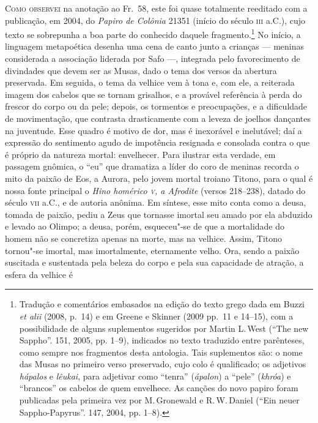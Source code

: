 \textsc{Como observei} na anotação ao Fr.~58, este foi quase totalmente reeditado com a 
publicação, em 2004, do \textit{Papiro de Colônia} 21351 (início do século \textsc{iii} a.C.), 
cujo texto se sobrepunha a boa parte do conhecido daquele fragmento.\footnote{Tradução e comentários embasados na edição do texto grego dada em Buzzi \textit{et alii} (2008, p.~14) e em Greene e Skinner (2009 pp.~11 e 14--15), com a possibilidade de alguns suplementos sugeridos por Martin L.\,West (``The new Sappho''. \textit{} 151, 2005, pp. 1--9), indicados no texto traduzido entre parênteses, como sempre nos fragmentos desta antologia. Tais suplementos são: o nome das Musas no primeiro verso preservado, cujo colo é qualificado; os adjetivos \textit{hápalos} e \textit{lêukai}, para adjetivar como ``tenra'' (\textit{ápalon}) a ``pele'' (\textit{khróa}) e ``brancos'' os cabelos de quem envelhece. As canções do novo papiro foram publicadas pela primeira vez por M.\,Gronewald e R.\,W.\,Daniel (``Ein neuer Sappho-Papyrus''. \textit{} 147, 2004, pp. 1--8).} No início, a 
linguagem metapoética desenha uma cena de canto junto a crianças --- meninas
considerada a associação liderada por Safo ---, 
integrada pelo favorecimento de divindades que devem ser as Musas,
dado o tema dos versos da abertura preservada. Em seguida, o tema da velhice
vem à tona e, com ele, a reiterada imagem dos cabelos que se tornam grisalhos,
e a provável referência à perda do frescor do corpo ou da pele; depois, os
tormentos e preocupações, e a dificuldade de movimentação, que contrasta
drasticamente com a leveza de joelhos dançantes na juventude. Esse quadro é
motivo de dor, mas é inexorável e inelutável; daí a expressão do sentimento
agudo de impotência resignada e consolada contra o que é próprio da natureza mortal: envelhecer. Para
ilustrar esta verdade, em passagem gnômica, o “eu” que dramatiza a líder do coro de meninas recorda o
mito da paixão de Eos, a Aurora, pelo jovem mortal troiano Titono, para o qual é nossa fonte
principal o \textit{Hino homérico \textsc{v}, a Afrodite }(versos 218--238), datado do
século \textsc{vii} a.C., e de autoria anônima. Em síntese, esse mito conta como a
deusa, tomada de paixão, pediu a Zeus que tornasse imortal seu amado por ela abduzido e levado ao Olimpo; a deusa,
porém, esqueceu"-se de que a mortalidade do homem não se concretiza apenas na
morte, mas na velhice. Assim, Titono tornou"-se imortal, mas imortalmente,
eternamente velho. Ora, sendo a paixão suscitada e sustentada pela
beleza do corpo e pela sua capacidade de atração, a esfera da velhice é
